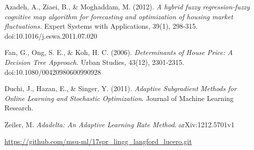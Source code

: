 \documentclass[10pt]{article}
\begin{document}
\begin{multicols}{2}
\begin{thebibliography}{13}
			Azadeh, A., Ziaei, B., \& Moghaddam, M. (2012).
			\textit{A hybrid fuzzy regression-fuzzy cognitive map algorithm for forecasting and optimization of housing market fluctuations.}
			Expert Systems with Applications, 39(1), 298-315. doi:10.1016/j.eswa.2011.07.020
			
			Fan, G., Ong, S. E., \& Koh, H. C. (2006).
			\textit{Determinants of House Price: A Decision Tree Approach.}
			Urban Studies, 43(12), 2301-2315. doi:10.1080/00420980600990928
			
			Duchi, J., Hazan, E., \& Singer, Y. (2011). \textit{Adaptive Subgradient Methods for Online Learning and Stochastic Optimization}. Journal of Machine Learning Research.
			
			Zeiler, M. \textit{Adadelta: An Adaptive Learning Rate Method}. arXiv:1212.5701v1
			
			\url{https://github.com/msu-ml/17spr_lingg_langford_lucero.git}
		\end{thebibliography}
	\end{multicols}
\end{document}

